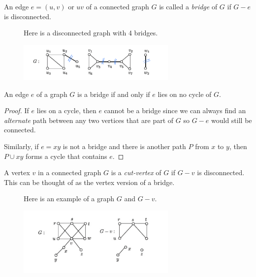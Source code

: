\begin{definition}[Bridge]
  An edge \(e = (u, v)\) or \(uv\) of a connected graph \(G\) is
  called a \textit{bridge} of \(G\) if \(G - e\) is disconnected.
\end{definition}

\begin{figure}[ht]
\begin{nexample}
  Here is a disconnected graph with 4 bridges.

  \centering
  \includegraphics[width=0.69\textwidth]{figures/l09/bridge-examples}
\end{nexample}
\end{figure}

\begin{theorem}
  An edge \(e\) of a graph \(G\) is a bridge if and only if \(e\)
  lies on no cycle of \(G\).
\end{theorem}

\begin{proof}
  If \(e\) lies on a cycle, then \(e\) cannot be a bridge since
  we can always find an \textit{alternate} path between any two
  vertices that are part of \(G\) so \(G-e\) would still be
  connected.

  Similarly, if \(e=xy\) is not a bridge and there is another
  path \(P\) from \(x\) to \(y\), then \(P \cup {xy}\) forms a
  cycle that contains \(e\).
\end{proof}

\begin{definition}
  A vertex \(v\) in a connected graph \(G\) is a
  \textit{cut-vertex} of \(G\) if \(G-v\) is disconnected.
  This can be thought of as the vertex version of a bridge.
\end{definition}

\begin{figure}[ht]
\begin{nexample}
  Here is an example of a graph \(G\) and \(G-v\).

  \centering
  \includegraphics[width=0.69\textwidth]{figures/l09/cut-vertex-example}
\end{nexample}
\end{figure}

